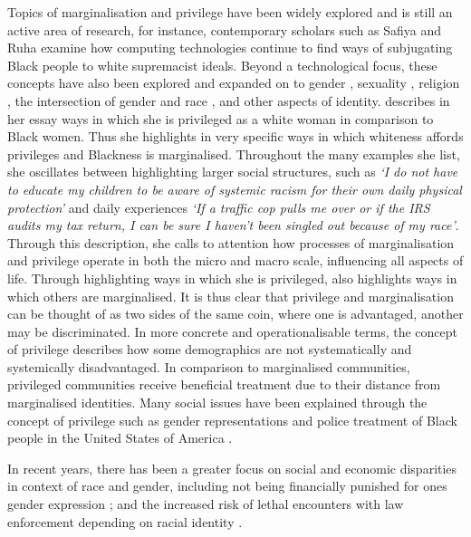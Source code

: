 Topics of marginalisation and privilege have been widely explored and is still an active area of research, for instance, contemporary scholars such as Safiya \citet{Noble:2018} and Ruha \citet{Benjamin:2019} examine how computing technologies continue to find ways of subjugating Black people to white supremacist ideals.
Beyond a technological focus, these concepts have also been explored and expanded on to gender \citep{Beauvoir:1953,Butler:1990,McIntosh:1988}, sexuality \citep{McCready:2004}, religion \citep{Beaman:2003}, the intersection of gender and race \citep{Crenshaw:1989,Voigt:2017}, and other aspects of identity.
\citet{McIntosh:1988} describes in her essay ways in which she is privileged as a white woman in comparison to Black women. Thus she highlights in very specific ways in which whiteness affords privileges and Blackness is marginalised.
Throughout the many examples she list, she oscillates between highlighting larger social structures, such as \textit{`I do not have to educate my children to be aware of systemic racism for their own daily physical protection'} and daily experiences \textit{`If a traffic cop pulls me over or if the IRS audits my tax return, I can be sure I haven't been singled out because of my race'}.
Through this description, she calls to attention how processes of marginalisation and privilege operate in both the micro and macro scale, influencing all aspects of life.
Through highlighting ways in which she is privileged, \citet{McIntosh:1988} also highlights ways in which others are marginalised.
It is thus clear that privilege and marginalisation can be thought of as two sides of the same coin, where one is advantaged, another may be discriminated.
In more concrete and operationalisable terms, the concept of privilege describes how some demographics are not systematically and systemically disadvantaged.
In comparison to marginalised communities, privileged communities receive beneficial treatment due to their distance from marginalised identities.
Many social issues have been explained through the concept of privilege such as gender representations \citep{Butler:1990} and police treatment of Black people in the United States of America \citep{Voigt:2017}.

In recent years, there has been a greater focus on social and economic disparities in context of race and gender, including not being financially punished for ones gender expression \citep{Lombardi:2002}; and the increased risk of lethal encounters with law enforcement depending on racial identity \citep{Zack:2015}.

